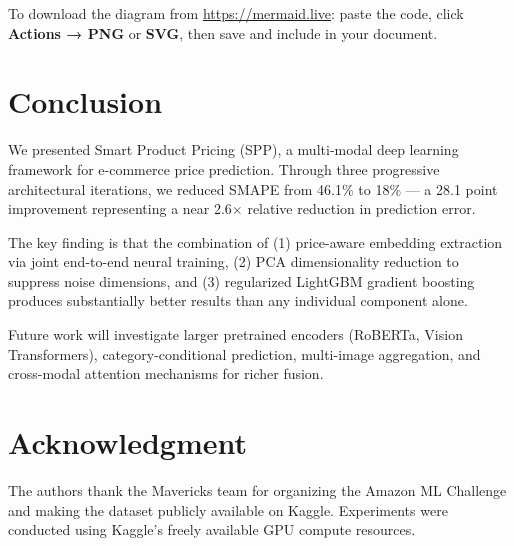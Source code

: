 \documentclass[conference]{IEEEtran}
\begin{document}
To download the diagram from \url{https://mermaid.live}: paste the code, click \textbf{Actions → PNG} or \textbf{SVG}, then save and include in your document.

\section{Conclusion}

We presented Smart Product Pricing (SPP), a multi-modal deep learning framework for e-commerce price prediction. Through three progressive architectural iterations, we reduced SMAPE from 46.1\% to 18\% — a 28.1 point improvement representing a near 2.6$\times$ relative reduction in prediction error.

The key finding is that the combination of (1) price-aware embedding extraction via joint end-to-end neural training, (2) PCA dimensionality reduction to suppress noise dimensions, and (3) regularized LightGBM gradient boosting produces substantially better results than any individual component alone.

Future work will investigate larger pretrained encoders (RoBERTa, Vision Transformers), category-conditional prediction, multi-image aggregation, and cross-modal attention mechanisms for richer fusion.

\section*{Acknowledgment}

The authors thank the Mavericks team for organizing the Amazon ML Challenge and making the dataset publicly available on Kaggle. Experiments were conducted using Kaggle's freely available GPU compute resources.
\end{document}
